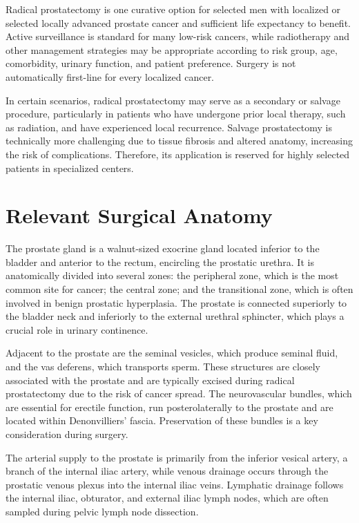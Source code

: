 Radical prostatectomy is one curative option for selected men with localized or selected locally advanced prostate cancer and sufficient life expectancy to benefit. Active surveillance is standard for many low-risk cancers, while radiotherapy and other management strategies may be appropriate according to risk group, age, comorbidity, urinary function, and patient preference. Surgery is not automatically first-line for every localized cancer.

In certain scenarios, radical prostatectomy may serve as a secondary or salvage procedure, particularly in patients who have undergone prior local therapy, such as radiation, and have experienced local recurrence. Salvage prostatectomy is technically more challenging due to tissue fibrosis and altered anatomy, increasing the risk of complications. Therefore, its application is reserved for highly selected patients in specialized centers.

\section*{Relevant Surgical Anatomy}
The prostate gland is a walnut-sized exocrine gland located inferior to the bladder and anterior to the rectum, encircling the prostatic urethra. It is anatomically divided into several zones: the peripheral zone, which is the most common site for cancer; the central zone; and the transitional zone, which is often involved in benign prostatic hyperplasia. The prostate is connected superiorly to the bladder neck and inferiorly to the external urethral sphincter, which plays a crucial role in urinary continence.

Adjacent to the prostate are the seminal vesicles, which produce seminal fluid, and the vas deferens, which transports sperm. These structures are closely associated with the prostate and are typically excised during radical prostatectomy due to the risk of cancer spread. The neurovascular bundles, which are essential for erectile function, run posterolaterally to the prostate and are located within Denonvilliers' fascia. Preservation of these bundles is a key consideration during surgery. 

The arterial supply to the prostate is primarily from the inferior vesical artery, a branch of the internal iliac artery, while venous drainage occurs through the prostatic venous plexus into the internal iliac veins. Lymphatic drainage follows the internal iliac, obturator, and external iliac lymph nodes, which are often sampled during pelvic lymph node dissection.

